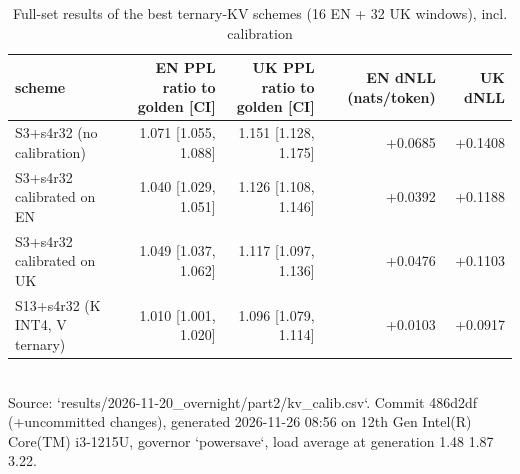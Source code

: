 \begin{table}[t]\centering\small
\caption{Full-set results of the best ternary-KV schemes (16 EN + 32 UK windows), incl. calibration}
\begin{tabular}{lrrrr}\toprule
scheme & EN PPL ratio to golden [CI] & UK PPL ratio to golden [CI] & EN dNLL (nats/token) & UK dNLL \\ \midrule
S3+s4r32 (no calibration) & 1.071 [1.055, 1.088] & 1.151 [1.128, 1.175] & +0.0685 & +0.1408 \\
S3+s4r32 calibrated on EN & 1.040 [1.029, 1.051] & 1.126 [1.108, 1.146] & +0.0392 & +0.1188 \\
S3+s4r32 calibrated on UK & 1.049 [1.037, 1.062] & 1.117 [1.097, 1.136] & +0.0476 & +0.1103 \\
S13+s4r32 (K INT4, V ternary) & 1.010 [1.001, 1.020] & 1.096 [1.079, 1.114] & +0.0103 & +0.0917 \\
\bottomrule\end{tabular}
\\[2pt]{\scriptsize Source: `results/2026-11-20\_overnight/part2/kv\_calib.csv`. Commit 486d2df (+uncommitted changes), generated 2026-11-26 08:56 on 12th Gen Intel(R) Core(TM) i3-1215U, governor `powersave`, load average at generation 1.48 1.87 3.22.}
\end{table}

